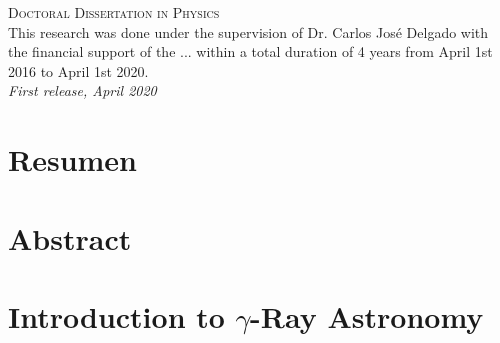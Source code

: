 \documentclass[12pt,fleqn]{book} %
\begin{document}

\noindent \textsc{Doctoral Dissertation in Physics}\\

\noindent This research was done under the supervision of Dr. Carlos José Delgado with the financial support of the ... within a total duration of 4 years from April 1st 2016 to April 1st 2020.\\ %

\noindent \textit{First release, April 2020} %



\chapter*{Resumen}


\chapter*{Abstract}







\pagestyle{empty} %

\tableofcontents %


\pagestyle{fancy} %




\chapter{Introduction to $\gamma$-Ray Astronomy} \label{cap:gammarayastro}

\end{document}

